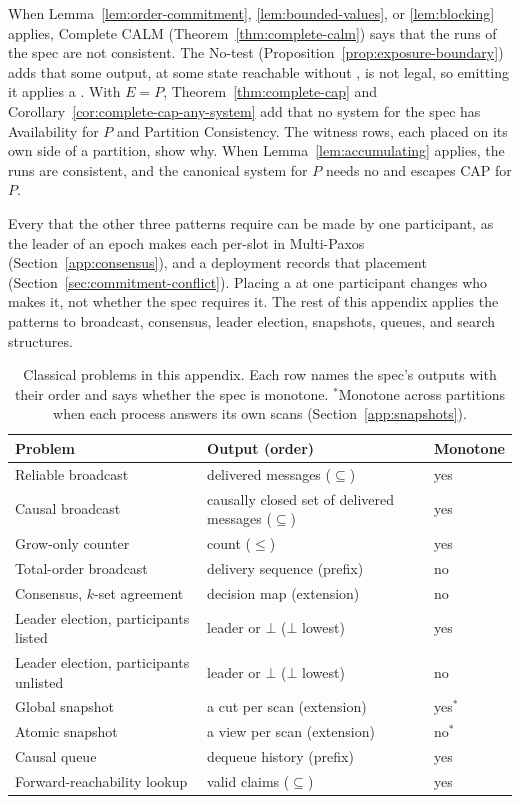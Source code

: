 When Lemma~\ref{lem:order-commitment}, \ref{lem:bounded-values}, or
\ref{lem:blocking} applies, Complete CALM (Theorem~\ref{thm:complete-calm})
says that the runs of the spec are not consistent.  The No-\commitment test
(Proposition~\ref{prop:exposure-boundary}) adds that some output, at some state
reachable without \commitment, is not legal, so emitting it applies a
\commitment.  With $E=P$, Theorem~\ref{thm:complete-cap} and
Corollary~\ref{cor:complete-cap-any-system} add that no system for the spec has
Availability for $P$ and Partition Consistency.  The witness rows, each placed
on its own side of a partition, show why.  When Lemma~\ref{lem:accumulating}
applies, the runs are consistent, and the canonical system for $P$ needs no
\commitment and escapes CAP for $P$.

Every \commitment that the other three patterns require can be made by one
participant, as the leader of an epoch makes each per-slot \commitment in
Multi-Paxos (Section~\ref{app:consensus}), and a deployment records that
placement (Section~\ref{sec:commitment-conflict}).  Placing a \commitment at
one participant changes who makes it, not whether the spec requires it.  The
rest of this appendix applies the patterns to broadcast, consensus, leader
election, snapshots, queues, and search structures.

\begin{table}[t]
  \centering
  \footnotesize
  \setlength{\tabcolsep}{3pt}
  \begin{tabular}{@{}>{\raggedright\arraybackslash}p{}>{\raggedright\arraybackslash}p{}l@{}}
    \toprule
    Problem & Output (order) & Monotone \\
    \midrule
    Reliable broadcast & delivered messages ($\subseteq$) & yes \\
    Causal broadcast & causally closed set of delivered messages ($\subseteq$) & yes \\
    Grow-only counter & count ($\leq$) & yes \\
    Total-order broadcast & delivery sequence (prefix) & no \\
    Consensus, $k$-set agreement & decision map (extension) & no \\
    Leader election, participants listed & leader or $\bot$ ($\bot$ lowest) & yes \\
    Leader election, participants unlisted & leader or $\bot$ ($\bot$ lowest) & no \\
    Global snapshot & a cut per scan (extension) & yes$^*$ \\
    Atomic snapshot & a view per scan (extension) & no$^*$ \\
    Causal queue & dequeue history (prefix) & yes \\
    Forward-reachability lookup & valid claims ($\subseteq$) & yes \\
    \bottomrule
  \end{tabular}
  \caption{Classical problems in this appendix.  Each row names the spec's
  outputs with their order and says whether the spec is monotone.
  $^*$Monotone across partitions when each process answers its own scans
  (Section~\ref{app:snapshots}).}
  \label{tab:classical-problems}
\end{table}

